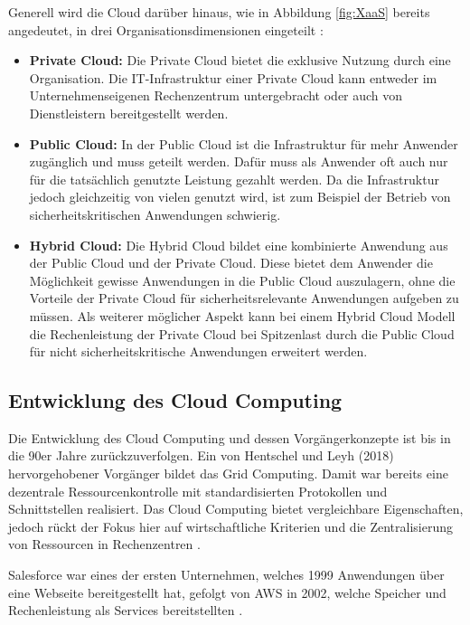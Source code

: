 Generell wird die Cloud darüber hinaus, wie in Abbildung \ref{fig:XaaS} bereits angedeutet, in drei Organisationsdimensionen eingeteilt \cite[Vgl. auch im Folgenden][S. 7ff]{Reinheimer2018}:
\begin{itemize}
\item \textbf{Private Cloud:} Die Private Cloud bietet die exklusive Nutzung durch eine Organisation. Die IT-Infrastruktur einer Private Cloud kann entweder im Unternehmenseigenen Rechenzentrum untergebracht oder auch von Dienstleistern bereitgestellt werden.
\item \textbf{Public Cloud:} In der Public Cloud ist die Infrastruktur für mehr Anwender zugänglich und muss geteilt werden. Dafür muss als Anwender oft auch nur für die tatsächlich genutzte Leistung gezahlt werden. Da die Infrastruktur jedoch gleichzeitig von vielen genutzt wird, ist zum Beispiel der Betrieb von sicherheitskritischen Anwendungen schwierig.
\item \textbf{Hybrid Cloud:} Die Hybrid Cloud bildet eine kombinierte Anwendung aus der Public Cloud und der Private Cloud. Diese bietet dem Anwender die Möglichkeit gewisse Anwendungen in die Public Cloud auszulagern, ohne die Vorteile der Private Cloud für sicherheitsrelevante Anwendungen aufgeben zu müssen. Als weiterer möglicher Aspekt kann bei einem Hybrid Cloud Modell die Rechenleistung der Private Cloud bei Spitzenlast durch die Public Cloud für nicht sicherheitskritische Anwendungen erweitert werden. 
\end{itemize} \pagebreak

\subsection{Entwicklung des Cloud Computing}
\label{sec:entwicklung}
Die Entwicklung des Cloud Computing und dessen Vorgängerkonzepte ist bis in die 90er Jahre zurückzuverfolgen. Ein von Hentschel und Leyh (2018) hervorgehobener Vorgänger bildet das Grid Computing. Damit war bereits eine dezentrale Ressourcenkontrolle mit standardisierten Protokollen und Schnittstellen realisiert. Das Cloud Computing bietet vergleichbare Eigenschaften, jedoch rückt der Fokus hier auf wirtschaftliche Kriterien und die Zentralisierung von Ressourcen in Rechenzentren \cite[Vgl.][S. 5f]{Reinheimer2018}.

Salesforce war eines der ersten Unternehmen, welches 1999 Anwendungen über eine Webseite bereitgestellt hat, gefolgt von \ac{AWS} in 2002, welche Speicher und Rechenleistung als Services bereitstellten \cite[Vgl.][S. 17f]{Srivastava2018}.

